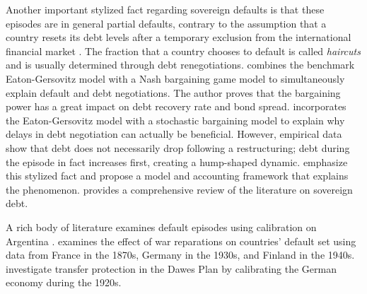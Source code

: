 Another important stylized fact regarding sovereign defaults is that these episodes are in general partial defaults, contrary to the assumption that a country resets its debt levels after a temporary exclusion from the international financial market \citep[see][]{Sturzenegger-Zettelmeyer-08,Cruces-Trebesch-13}. The fraction that a country chooses to default is called \emph{haircuts} and is usually determined through debt renegotiations.
\citet{Yue-10} combines the benchmark Eaton-Gersovitz model with a Nash bargaining game model to simultaneously explain default and debt negotiations. The author proves that the bargaining power has a great impact on debt recovery rate and bond spread.
\citet{Bi-08} incorporates the Eaton-Gersovitz model with a stochastic bargaining model to explain why delays in debt negotiation can actually be beneficial.
However, empirical data show that debt does not necessarily drop following a restructuring; debt during the episode in fact increases first, creating a hump-shaped dynamic. \citet{Arellano-23-partial-default} emphasize this stylized fact and propose a model and accounting framework that explains the phenomenon. \citet{sovereign-debt-review-yue-19} provides a comprehensive review of the literature on sovereign debt.


A rich body of literature examines default episodes using calibration on Argentina \citep{Arellano-08, Schmitt-Uribe-16,Mendoza-Yue-12,Na-18}. \citet*{Hinrichsen_2020-chapter4} examines the effect of war reparations on countries' default set using data from France in the 1870s, Germany in the 1930s, and Finland in the 1940s. \citet*{Ho-Ritschl-23} investigate transfer protection in the Dawes Plan by calibrating the German economy during the 1920s.